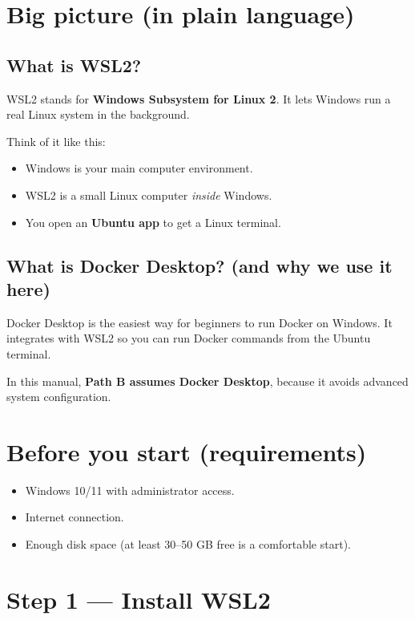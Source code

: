 \section{Big picture (in plain language)}
\subsection{What is WSL2?}
WSL2 stands for \textbf{Windows Subsystem for Linux 2}. It lets Windows run a real Linux system in the background.

Think of it like this:
\begin{itemize}[leftmargin=*]
  \item Windows is your main computer environment.
  \item WSL2 is a small Linux computer \emph{inside} Windows.
  \item You open an \textbf{Ubuntu app} to get a Linux terminal.
\end{itemize}

\subsection{What is Docker Desktop? (and why we use it here)}
Docker Desktop is the easiest way for beginners to run Docker on Windows.
It integrates with WSL2 so you can run Docker commands from the Ubuntu terminal.

In this manual, \textbf{Path B assumes Docker Desktop}, because it avoids advanced system configuration.


\section{Before you start (requirements)}
\begin{itemize}[leftmargin=*]
  \item Windows 10/11 with administrator access.
  \item Internet connection.
  \item Enough disk space (at least 30--50 GB free is a comfortable start).
\end{itemize}

\section{Step 1 --- Install WSL2}
